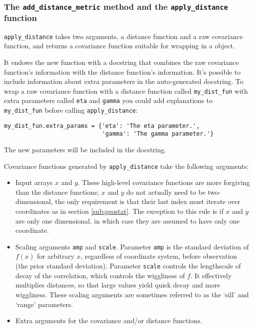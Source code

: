 \documentclass[]{manual}
\begin{document}
\subsubsection{The \texttt{add_distance_metric} method and the \texttt{apply_distance} function}\label{sub:add_distance_metric}
\texttt{apply_distance} takes two arguments, a distance function and a raw covariance function, and returns a covariance function suitable for wrapping in a  object. 

It endows the new function with a docstring that combines the raw covariance function's information with the distance function's information. It's possible to include information about extra parameters in the auto-generated docstring. To wrap a raw covariance function with a distance function called \texttt{my_dist_fun} with extra parameters called \texttt{eta} and \texttt{gamma} you could add explanations to \texttt{my_dist_fun} before calling \texttt{apply_distance}:
\begin{verbatim}
my_dist_fun.extra_params = {'eta': 'The eta parameter.', 
                            'gamma': 'The gamma parameter.'}
\end{verbatim}
The new parameters will be included in the docstring.

Covariance functions generated by \texttt{apply_distance} take the following arguments:
\begin{itemize}
    \item Input arrays $x$ and $y$. These high-level covariance functions are more forgiving than the distance functions; $x$ and $y$ do not actually need to be two-dimensional, the only requirement is that their last index must iterate over coordinates as in section \ref{sub:geostat}. The exception to this rule is if $x$ and $y$ are only one dimensional, in which case they are assumed to have only one coordinate.
    \item Scaling arguments \texttt{amp} and \texttt{scale}. Parameter \texttt{amp} is the standard deviation of $f(x)$ for arbitrary $x$, regardless of coordinate system, before observation (the prior standard deviation). Parameter \texttt{scale} controls the lengthscale of decay of the correlation, which controls the wiggliness of $f$. It effectively multiplies distances, so that large values yield quick decay and more wiggliness. These scaling arguments are sometimes referred to as the `sill' and `range' parameters.
    \item Extra arguments for the covariance and/or distance functions.
\end{itemize}
\end{document}
